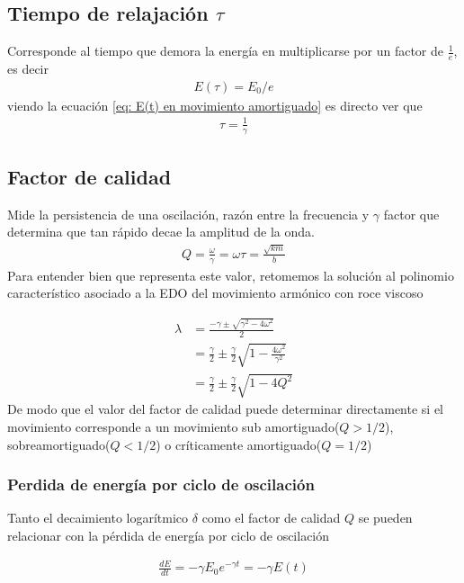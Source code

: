 \documentclass[12pt]{article}
\begin{document}
\subsection{Tiempo de relajación \(\tau\)}
Corresponde al tiempo que demora la energía en multiplicarse por un factor de \(\frac{1}{e}\), es decir
\begin{align*}
    E(\tau) = E_0/ e
\end{align*}
 viendo la ecuación \eqref{eq: E(t) en movimiento amortiguado} es directo ver que
\begin{align}
    \tau = \frac{1}{\gamma}
\end{align}
\subsection{Factor de calidad}
Mide la persistencia de una oscilación, razón entre la frecuencia y \(\gamma \) factor que determina que tan rápido decae la amplitud de la onda.
\begin{align}
    Q = \frac{\omega}{\gamma} = \omega \tau = \frac{\sqrt{km}}{b}
\end{align}
Para entender bien que representa este valor, retomemos la solución al polinomio característico asociado a la EDO del movimiento armónico con roce viscoso

\begin{align*}
    \lambda &= \frac{- \gamma \pm \sqrt{\gamma^{2} - 4\omega^{2}}}{2}\\
    &= \frac{\gamma}{2} \pm \frac{\gamma}{2} \sqrt{1 - \frac{4 \omega^{2}}{\gamma^{2}}}\\
    &= \frac{\gamma}{2} \pm \frac{\gamma}{2} \sqrt{1 - 4Q^{2}}
\end{align*}
De modo que el valor del factor de calidad puede determinar directamente si el movimiento corresponde a un movimiento sub amortiguado(\(Q > 1/2\)), sobreamortiguado(\(Q< 1/2\)) o críticamente amortiguado(\(Q=1/2\))


\subsubsection*{Perdida de energía por ciclo de oscilación}
Tanto el decaimiento logarítmico \(\delta\) como el factor de calidad \(Q\) se pueden relacionar con la pérdida de energía por ciclo de oscilación 




\begin{align*}
    \frac{dE}{dt} = - \gamma E_{0} e^{-\gamma t} = -\gamma E(t)
\end{align*}
\end{document}
